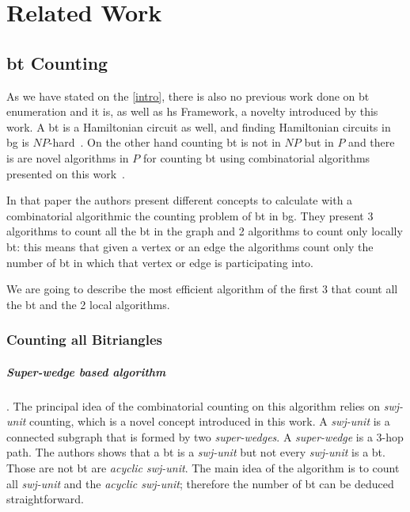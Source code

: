 \chapter{Related Work}\label{relate-work}

\section{\acrlong{bt} Counting}
As we have stated on the \autoref{intro}, there is also no previous work done on \acrshort{bt} enumeration and it is, as well as \acrshort{hs} Framework, a novelty introduced by this work.
A \acrshort{bt} is a Hamiltonian circuit as well, and finding Hamiltonian circuits in \acrshort{bg} is $NP$-hard~\cite{hamilbipartite-np}. On the other hand counting \acrshort{bt} is not in $NP$ 
but in $P$ and there is are novel algorithms in $P$ for counting \acrshort{bt} using combinatorial algorithms presented on this work~\cite{btcount}.

In that paper the authors present different concepts to calculate with a combinatorial algorithmic the counting problem of \acrshort{bt} in \acrshort{bg}. They present 3 algorithms to count
all the \acrshort{bt} in the graph and 2 algorithms to count only locally \acrshort{bt}: this means that given a vertex or an edge the algorithms count only the number of \acrshort{bt} in which 
that vertex or edge is participating into.

We are going to describe the most efficient algorithm of the first 3 that count all the \acrshort{bt} and the 2 local algorithms.

\subsection{Counting all Bitriangles}
\paragraph{Super-wedge based algorithm}.
The principal idea of the combinatorial counting on this algorithm relies on \emph{swj-unit} counting, which is a novel 
concept introduced in this work. A \emph{swj-unit} is a connected subgraph that is formed by two \emph{super-wedges}. A \emph{super-wedge}
is a 3-hop path. The authors shows that a \acrshort{bt} is a \emph{swj-unit} but not every \emph{swj-unit} is a \acrshort{bt}. Those 
are not \acrshort{bt} are \emph{acyclic swj-unit}. The main idea of the algorithm is to count all \emph{swj-unit} and the \emph{acyclic swj-unit}; therefore
the number of \acrshort{bt} can be deduced straightforward.

